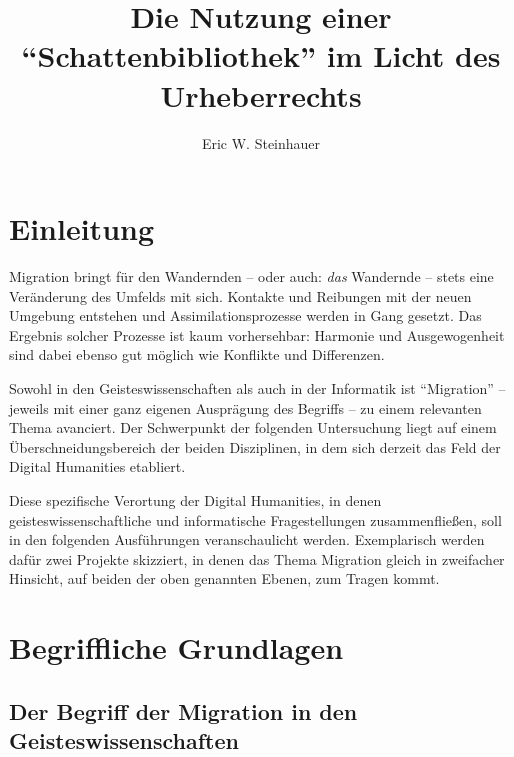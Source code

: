 \documentclass[a4paper,
fontsize=11pt,
oneside,
numbers=noperiodatend,
parskip=half-,
bibliography=totoc,
final
]{scrartcl}
\title{\LARGE{Die Nutzung einer \enquote{Schattenbibliothek} im Licht des Urheberrechts}} %
\author{Eric W. Steinhauer} %
\date{}
\begin{document}
\maketitle
\thispagestyle{fancyplain} 


\section*{Einleitung}\label{einleitung}

Migration bringt für den Wandernden -- oder auch: \emph{das} Wandernde
-- stets eine Veränderung des Umfelds mit sich. Kontakte und Reibungen
mit der neuen Umgebung entstehen und Assimilationsprozesse werden in
Gang gesetzt. Das Ergebnis solcher Prozesse ist kaum vorhersehbar:
Harmonie und Ausgewogenheit sind dabei ebenso gut möglich wie Konflikte
und Differenzen.

Sowohl in den Geisteswissenschaften als auch in der Informatik ist
\enquote{Migration} -- jeweils mit einer ganz eigenen Ausprägung des
Begriffs -- zu einem relevanten Thema avanciert. Der Schwerpunkt der
folgenden Untersuchung liegt auf einem Überschneidungsbereich der beiden
Disziplinen, in dem sich derzeit das Feld der Digital Humanities
etabliert.

Diese spezifische Verortung der Digital Humanities, in denen
geisteswissenschaftliche und informatische Fragestellungen
zusammenfließen, soll in den folgenden Ausführungen veranschaulicht
werden. Exemplarisch werden dafür zwei Projekte skizziert, in denen das
Thema Migration gleich in zweifacher Hinsicht, auf beiden der oben
genannten Ebenen, zum Tragen kommt.

\section*{Begriffliche Grundlagen}\label{begriffliche-grundlagen}

\subsection*{Der Begriff der Migration in den
Geisteswissenschaften}\label{der-begriff-der-migration-in-den-geisteswissenschaften}
\end{document}
